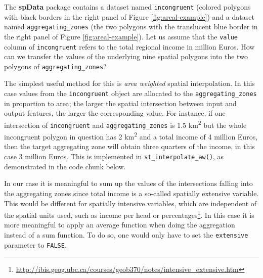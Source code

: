 \documentclass[]{krantz}
\newenvironment{Shaded}{\begin{snugshade}}{\end{snugshade}}
\newcommand{\CommentTok}[1]{\textcolor[rgb]{0.37,0.37,0.37}{\textit{#1}}}
\newcommand{\DataTypeTok}[1]{\textcolor[rgb]{0.27,0.27,0.27}{#1}}
\newcommand{\KeywordTok}[1]{\textcolor[rgb]{0.27,0.27,0.27}{\textbf{#1}}}
\newcommand{\NormalTok}[1]{#1}
\newcommand{\OperatorTok}[1]{\textcolor[rgb]{0.43,0.43,0.43}{\textbf{#1}}}
\newcommand{\OtherTok}[1]{\textcolor[rgb]{0.37,0.37,0.37}{#1}}
\newcommand{\StringTok}[1]{\textcolor[rgb]{0.5,0.5,0.5}{#1}}
\let\rmarkdownfootnote\footnote%
\def\footnote{\protect\rmarkdownfootnote}
\renewcommand{\href}[2]{#2\footnote{\url{#1}}}
\begin{document}
The \textbf{spData} package contains a dataset named \texttt{incongruent} (colored polygons with black borders in the right panel of Figure \ref{fig:areal-example}) and a dataset named \texttt{aggregating\_zones} (the two polygons with the translucent blue border in the right panel of Figure \ref{fig:areal-example}).
Let us assume that the \texttt{value} column of \texttt{incongruent} refers to the total regional income in million Euros.
How can we transfer the values of the underlying nine spatial polygons into the two polygons of \texttt{aggregating\_zones}?

The simplest useful method for this is \emph{area weighted} spatial interpolation.
In this case values from the \texttt{incongruent} object are allocated to the \texttt{aggregating\_zones} in proportion to area; the larger the spatial intersection between input and output features, the larger the corresponding value.
For instance, if one intersection of \texttt{incongruent} and \texttt{aggregating\_zones} is 1.5 km\textsuperscript{2} but the whole incongruent polygon in question has 2 km\textsuperscript{2} and a total income of 4 million Euros, then the target aggregating zone will obtain three quarters of the income, in this case 3 million Euros.
This is implemented in \texttt{st\_interpolate\_aw()}, as demonstrated in the code chunk below.

\begin{Shaded}
\end{Shaded}

In our case it is meaningful to sum up the values of the intersections falling into the aggregating zones since total income is a so-called spatially extensive variable.
This would be different for spatially intensive variables, which are independent of the spatial units used, such as income per head or \href{http://ibis.geog.ubc.ca/courses/geob370/notes/intensive_extensive.htm}{percentages}.
In this case it is more meaningful to apply an average function when doing the aggregation instead of a sum function.
To do so, one would only have to set the \texttt{extensive} parameter to \texttt{FALSE}.
\end{document}
